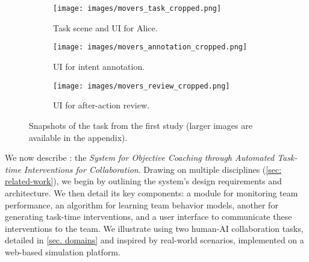 \section{\coach}
\label{sec. coach}
\begin{figure}[h]
  \centering
  \newcommand\gap{0.495}
  \begin{subfigure}[t]{\gap\linewidth}
      \centering
      \texttt{[image: images/movers\_task\_cropped.png]}
      \caption{Task scene and UI for Alice.}
      \label{fig. ui for task}
  \end{subfigure}
  \hfill
    \begin{subfigure}[t]{\gap\linewidth}
      \centering
      \texttt{[image: images/movers\_annotation\_cropped.png]}
      \caption{UI for intent annotation.}
      \label{fig. ui for intent selection}
  \end{subfigure}
  \hfill
  \begin{subfigure}[t]{\gap\linewidth}
      \centering
      \texttt{[image: images/movers\_review\_cropped.png]}
      \caption{UI for after-action review.}
      \label{fig. ui for post-session review}
  \end{subfigure}
  \captionsetup{subrefformat=parens}
  \caption{Snapshots of the \movers task from the first study (larger images are available in the appendix).}
  \label{fig. ui}
\end{figure}
We now describe \coach: the \textit{System for Objective Coaching through Automated Task-time Interventions for Collaboration}.
Drawing on multiple disciplines (\cref{sec: related-work}), we begin by outlining the system's design requirements and architecture.
We then detail its key components: a module for monitoring team performance, an algorithm for learning team behavior models, another for generating task-time interventions, and a user interface to communicate these interventions to the team.
We illustrate \coach using two human-AI collaboration tasks, detailed in \cref{sec. domains} and inspired by real-world scenarios, implemented on a web-based simulation platform.







